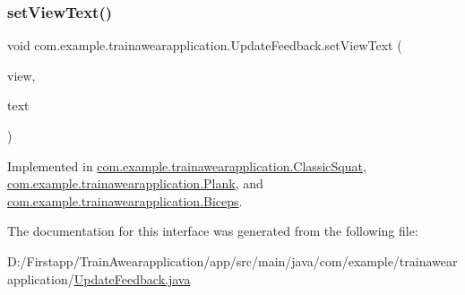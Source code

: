 \subsubsection{\texorpdfstring{setViewText()}{setViewText()}}
{\footnotesize\ttfamily void com.\+example.\+trainawearapplication.\+Update\+Feedback.\+set\+View\+Text (\begin{DoxyParamCaption}\item[{Text\+View}]{view,  }\item[{String}]{text }\end{DoxyParamCaption})}



Implemented in \mbox{\hyperlink{classcom_1_1example_1_1trainawearapplication_1_1_classic_squat_ab193e39e2f1255fd88d0508cfe7a63ff}{com.\+example.\+trainawearapplication.\+Classic\+Squat}}, \mbox{\hyperlink{classcom_1_1example_1_1trainawearapplication_1_1_plank_a4d4a46b71ced8fe89023ccbf14d17f77}{com.\+example.\+trainawearapplication.\+Plank}}, and \mbox{\hyperlink{classcom_1_1example_1_1trainawearapplication_1_1_biceps_a6e1ab1b99cd05b29fb7346b0642b7d0e}{com.\+example.\+trainawearapplication.\+Biceps}}.



The documentation for this interface was generated from the following file\+:\begin{DoxyCompactItemize}
\item 
D\+:/\+Firstapp/\+Train\+Awearapplication/app/src/main/java/com/example/trainawearapplication/\mbox{\hyperlink{_update_feedback_8java}{Update\+Feedback.\+java}}\end{DoxyCompactItemize}
